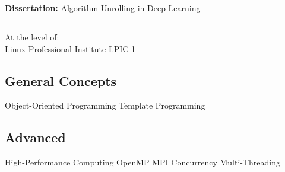\documentclass[a4paper]{MagicalCV}
\begin{document}
\begin{minipage}[t]{0.66\textwidth}




\textbf{Dissertation: }
Algorithm Unrolling in Deep Learning
\sectionsep


\subsection{}
At the level of:\\Linux Professional Institute LPIC-1  
\sectionsep


\subsection{General Concepts}
Object-Oriented Programming \textbullet{} Template Programming \textbullet{}  
\sectionsep
\subsection{Advanced}
High-Performance Computing \textbullet{} \textbullet{} OpenMP \textbullet{} MPI \textbullet{} Concurrency \textbullet{} Multi-Threading \textbullet{}
\sectionsep



\end{minipage}
\end{document}

